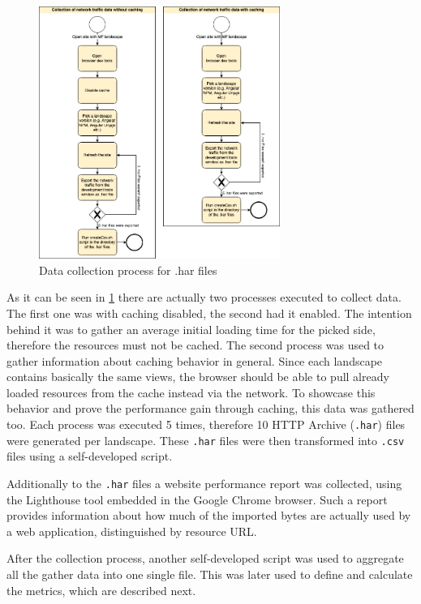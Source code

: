 \begin{figure}[!h]
	\centering
	\includegraphics[width=0.7\textwidth]{Figures/Data_Collection_Process_har.drawio.png}
	\caption{Data collection process for .har files}
	\label{fig:data_collection_process_har}
\end{figure}

As it can be seen in \ref{fig:data_collection_process_har} there are actually two processes executed to collect data. The first one was with caching disabled, the second had it enabled. The intention behind it was to gather an average initial loading time for the picked side, therefore the resources must not be cached. 
The second process was used to gather information about caching behavior in general. Since each landscape contains basically the same views, the browser should be able to pull already loaded resources from the cache instead via the network. To showcase this behavior and prove the performance gain through caching, this data was gathered too.
Each process was executed 5 times, therefore 10 HTTP Archive (\texttt{.har}) files were generated per landscape. These \texttt{.har} files were then transformed into \texttt{.csv} files using a self-developed script. 

Additionally to the \texttt{.har} files a website performance report was collected, using the Lighthouse tool embedded in the Google Chrome browser. Such a report provides information about how much of the imported bytes are actually used by a web application, distinguished by resource URL.

After the collection process, another self-developed script was used to aggregate all the gather data into one single file. This was later used to define and calculate the metrics, which are described next.

